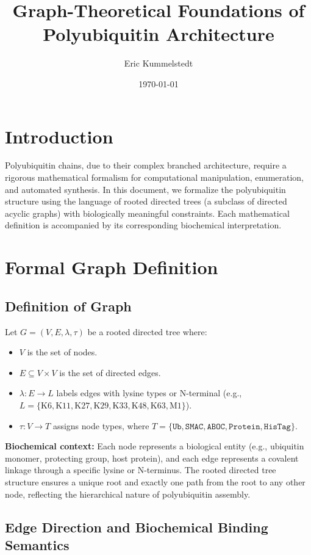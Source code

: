 \documentclass[12pt]{article}
\title{\textbf{Graph-Theoretical Foundations of Polyubiquitin Architecture}}
\author{Eric Kummelstedt}
\date{\today}
\begin{document}
\maketitle

\section*{Introduction}
Polyubiquitin chains, due to their complex branched architecture, require a rigorous mathematical formalism for computational manipulation, enumeration, and automated synthesis. In this document, we formalize the polyubiquitin structure using the language of rooted directed trees (a subclass of directed acyclic graphs) with biologically meaningful constraints. Each mathematical definition is accompanied by its corresponding biochemical interpretation.

\section{Formal Graph Definition}


\subsection*{Definition of Graph}
Let $G = (V, E, \lambda, \tau)$ be a rooted directed tree where:
\begin{itemize}
    \item $V$ is the set of nodes.
    \item $E \subseteq V \times V$ is the set of directed edges.
    \item $\lambda : E \to L$ labels edges with lysine types or N-terminal (e.g., $L = \{\text{K6}, \text{K11}, \text{K27}, \text{K29}, \text{K33}, \text{K48}, \text{K63}, \text{M1}\}$).
    \item $\tau : V \to T$ assigns node types, where $T = \{\texttt{Ub}, \texttt{SMAC}, \texttt{ABOC}, \texttt{Protein}, \texttt{HisTag}\}$.
\end{itemize}

\textbf{Biochemical context:} Each node represents a biological entity (e.g., ubiquitin monomer, protecting group, host protein), and each edge represents a covalent linkage through a specific lysine or N-terminus. The rooted directed tree structure ensures a unique root and exactly one path from the root to any other node, reflecting the hierarchical nature of polyubiquitin assembly.

\subsection*{Edge Direction and Biochemical Binding Semantics}
\end{document}
